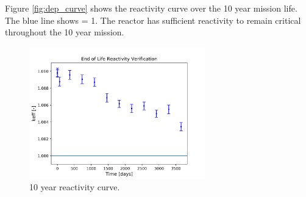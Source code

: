 Figure \ref{fig:dep_curve} shows the reactivity curve over the 10 year mission
life. The blue line shows \keff = 1. The reactor has sufficient reactivity to
remain critical throughout the 10 year mission.

\begin{figure}[h]
    \centering
    \includegraphics[width=3in]{../images/depletion_results.png}
\caption{10 year reactivity curve.}
\label{fig:depl_curve}
\end{figure}
